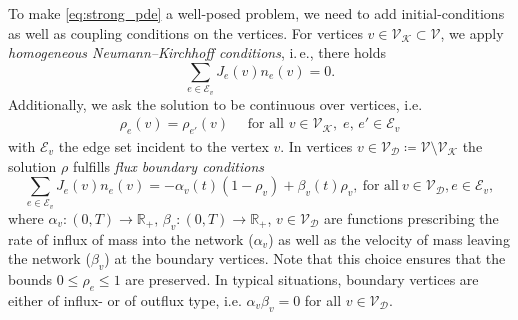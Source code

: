 To make \cref{eq:strong_pde} a well-posed problem, we need to add initial-conditions as well as coupling conditions on the vertices. 
For vertices $v \in \mathcal{V}_\mathcal{K} \subset \mathcal{V}$, we apply \emph{homogeneous Neumann--Kirchhoff conditions}, i.\,e., there holds
\begin{equation}
\label{eq:Kirchhoff_Neumann_condition}
    \sum_{e\in \mathcal{E}_v}J_e(v) n_e (v)=0.
\end{equation}
Additionally, we ask the solution to be continuous over vertices, i.e. 
\begin{align}
    \rho_e(v) = \rho_{e'}(v) \quad \text{ for all }v \in \mathcal{V}_\mathcal{K},\; e,\,e' \in \mathcal{E}_v
\end{align}
with $\mathcal{E}_v$ the edge set incident to the vertex $v$.
In vertices $v\in \mathcal{V}_\mathcal{D}\coloneqq\mathcal{V}\setminus \mathcal{V}_\mathcal{K}$ the solution $\rho$ fulfills \emph{flux boundary conditions}
\begin{equation}
\label{eq:Dirichlet_conditions}
    \sum_{e\in \mathcal{E}_v}J_e(v) n_e (v)=-\alpha_v(t) (1-\rho_v) + \beta_v(t) \rho_v,\ \text{for all}\ v \in \mathcal{V}_\mathcal{D}, e \in \mathcal{E}_v,
\end{equation}
where 
$\alpha_v\colon(0,T) \to \mathbb{R}_{+}, \, \beta_v \colon (0,T) \to \mathbb{R}_{+}$, ${v \in \mathcal{V}_\mathcal{D}}$
are functions prescribing the rate of influx of mass into the network ($\alpha_v$) as well as the velocity of mass leaving the network ($\beta_v$) at the boundary vertices. Note that this choice ensures that the bounds $0 \le \rho_e \le 1$ are preserved. In typical situations, boundary vertices are either of influx- or of outflux type, i.e. $\alpha_v \beta_v = 0$ for all $v \in \mathcal{V}_\mathcal{D}$.


